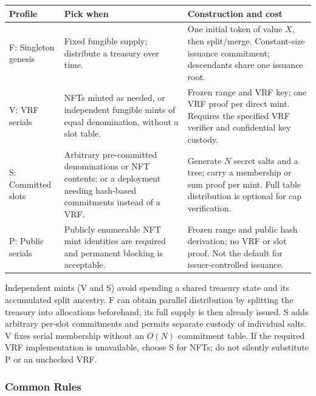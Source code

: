 \begin{longtable}{>{\raggedright\arraybackslash}p{2.6cm}>{\raggedright\arraybackslash}p{4.9cm}>{\raggedright\arraybackslash}p{6.6cm}}
\textbf{Profile} & \textbf{Pick when} & \textbf{Construction and cost} \\
\hline
\endhead
F: Singleton genesis & Fixed fungible supply; distribute a treasury over time. & One initial token of value $X$, then split/merge. Constant-size issuance commitment; descendants share one issuance root. \\
V: VRF serials & NFTs minted as needed, or independent fungible mints of equal denomination, without a slot table. & Frozen range and VRF key; one VRF proof per direct mint. Requires the specified VRF verifier and confidential key custody. \\
S: Committed slots & Arbitrary pre-committed denominations or NFT contents; or a deployment needing hash-based commitments instead of a VRF. & Generate $N$ secret salts and a tree; carry a membership or sum proof per mint. Full table distribution is optional for cap verification. \\
P: Public serials & Publicly enumerable NFT mint identities are required and permanent blocking is acceptable. & Frozen range and public hash derivation; no VRF or slot proof. Not the default for issuer-controlled issuance. \\
\end{longtable}

Independent mints (V and S) avoid spending a shared treasury state and its accumulated split ancestry. F can obtain parallel distribution by splitting the treasury into allocations beforehand; its full supply is then already issued. S adds arbitrary per-slot commitments and permits separate custody of individual salts. V fixes serial membership without an $O(N)$ commitment table. If the required VRF implementation is unavailable, choose S for NFTs; do not silently substitute P or an unchecked VRF.

\subsubsection{Common Rules}

